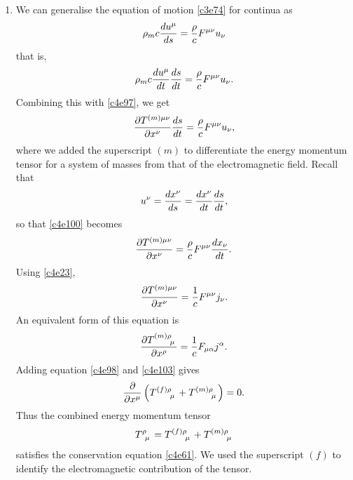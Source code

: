 \begin{enumerate}
\item We can generalise the equation of motion \eqref{c3e74} for continua as
\begin{equation}\label{c4e99}
\rho_m c\frac{d{u^\mu}}{d{s}} = \frac{\rho}{c}F^{\mu\nu}u_\nu
\end{equation}
that is,
\[
\rho_m c\frac{d{u^\mu}}{d{t}}\frac{d{s}}{d{t}} = \frac{\rho}{c}F^{\mu\nu}u_\nu.
\]
Combining this with \eqref{c4e97}, we get
\begin{equation}\label{c4e100}
\frac{\partial{T^{(m)\mu\nu}}}{\partial{x^\nu}}\frac{d{s}}{d{t}} = \frac{\rho}{c}F^{\mu\nu}u_\nu,
\end{equation}
where we added the superscript $(m)$ to differentiate the energy momentum tensor
for a system of masses from that of the electromagnetic field. Recall that
\[
u^\nu = \frac{d{x^\nu}}{d{s}} = \frac{d{x^\nu}}{d{t}}\frac{d{s}}{d{t}},
\]
so that \eqref{c4e100} becomes
\begin{equation}\label{c4e101}
\frac{\partial{T^{(m)\mu\nu}}}{\partial{x^\nu}} = \frac{\rho}{c}F^{\mu\nu}\frac{d{x_\nu}}{d{t}}.
\end{equation}
Using \eqref{c4e23},
\begin{equation}\label{c4e102}
\frac{\partial{T^{(m)\mu\nu}}}{\partial{x^\nu}} = \frac{1}{c}F^{\mu\nu}j_\nu.
\end{equation}
An equivalent form of this equation is
\begin{equation}\label{c4e103}
\pdt{\tensor{T}{^{(m)\rho}_\mu}}{x^\rho} = \frac{1}{c}F_{\mu\alpha}j^\alpha.
\end{equation}
Adding equation \eqref{c4e98} and \eqref{c4e103} gives
\begin{equation}\label{c4e104}
\frac{\partial}{\partial x^\mu}\left(\tensor{T}{^{(f)\rho}_\mu} + \tensor{T}{^{(m)\rho}_\mu}\right) = 0.
\end{equation}
Thus the combined energy momentum tensor 
\begin{equation}\label{c4e105}
\tensor{T}{^\rho_\mu} = \tensor{T}{^{(f)\rho}_\mu} + \tensor{T}{^{(m)\rho}_\mu}
\end{equation}
satisfies the conservation equation \eqref{c4e61}. We used the superscript $(f)$
to identify the electromagnetic contribution of the tensor.


\end{enumerate}
